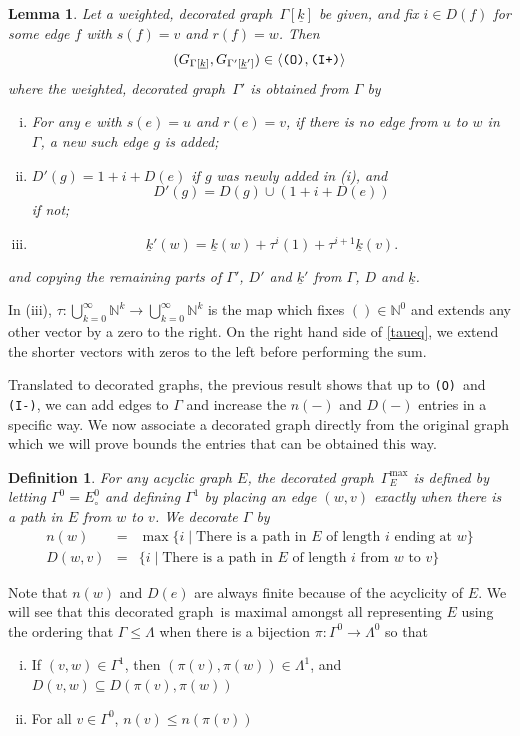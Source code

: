 \documentclass[12pt]{amsbook}%
\newtheorem{lemma}[theor]{Lemma}
\theoremstyle{defin}
\newtheorem{defin}[theor]{Definition}
\theoremstyle{remark}
\numberwithin{equation}{chapter}
\numberwithin{theor}{section}
\newcommand{\kk}{\underline{k}}
\newcommand{\NN}{\mathbb{N}}
\newcommand{\IIIm}{\mbox{\texttt{\textup{(I-)}}}}
\newcommand{\IIIp}{\mbox{\texttt{\textup{(I+)}}}}
\newcommand{\OOO}{\mbox{\texttt{\textup{(O)}}}}
\newcommand{\WDG}{weighted, decorated graph}
\newcommand{\DG}{decorated graph}
\newcommand{\singX}{{\circ}}
\begin{document}
\begin{lemma}\label{increaseWDG}
Let a \WDG\ $\Gamma[\kk]$ be given, and fix $i\in D(f)$ for some edge $f$ with $s(f)=v$ and $r(f)=w$. Then
\[
(G_{\Gamma[\kk]},G_{\Gamma'[\kk']})\in \langle \OOO,\IIIp\rangle
\]
where the \WDG\ $\Gamma'$ is obtained from $\Gamma$ by
\begin{enumerate}[(i)]
\item For any $e$ with $s(e)=u$ and $r(e)=v$, if there is no edge from $u$ to $w$ in $\Gamma$, a new such edge $g$ is added;
\item $D'(g)=1+i+D(e)$ if $g$ was newly added in (i), and
\[
D'(g)=D(g)\cup (1+i+D(e))
\]
if not;
\item 
\begin{equation}\label{taueq}
\kk'(w)=\kk(w)+\tau^i(1)+\tau^{i+1}\kk(v).
\end{equation}
\end{enumerate}
and copying the remaining parts of $\Gamma'$, $D'$ and $\kk'$ from $\Gamma$, $D$  and $\kk$.
\end{lemma}

In (iii), $\tau:\bigcup_{k=0}^\infty\NN^k\to\bigcup_{k=0}^\infty\NN^k$ is the map which fixes $()\in\NN^0$ and extends any other vector by a zero to the right. On the right hand side of \eqref{taueq}, we extend the shorter vectors with zeros to the left before performing the sum.

Translated to decorated graphs, the previous result shows that up to \OOO\ and \IIIm, we can add edges to $\Gamma$ and increase the $n(-)$ and $D(-)$ entries in a specific way. We now associate a decorated graph directly from the original graph which we will prove bounds the entries that can be obtained this way.

\newcommand{\DGmax}[1][E]{\Gamma^{\max}_{#1}}

\begin{defin}
For any acyclic graph $E$, the \DG\ $\DGmax$ is defined by letting $\Gamma^0=E^0_\singX$ and defining $\Gamma^1$ by placing an edge $(w,v)$ exactly when there is a path in $E$ from $w$ to $v$. We decorate $\Gamma$ by
\begin{eqnarray*}
n(w)&=&\max \{i\mid \text{There is a path in }E\text{ of length }i\text{ ending at } w\}\\
D(w,v)&=& \{i\mid \text{There is a path in }E\text{ of length }i\text{ from } w\text{ to }v\}
\end{eqnarray*}
\end{defin}

Note that $n(w)$ and $D(e)$ are always finite because of the acyclicity of $E$.
We will see that this \DG\ is maximal amongst all representing $E$ using the ordering that $\Gamma\leq \Lambda$ when there is a bijection $\pi:\Gamma^0\to\Lambda ^0$ so that
\begin{enumerate}[(i)]
\item If $(v,w)\in \Gamma^1$, then  $(\pi(v),\pi(w))\in \Lambda^1$, and $D(v,w)\subseteq D(\pi(v),\pi(w))$
\item For all $v\in \Gamma^0$, $n(v)\leq n(\pi(v))$
\end{enumerate}
\end{document}
